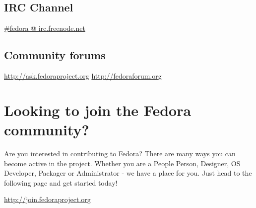 \documentclass[
letterpaper,
10pt
]{leaflet}
\begin{document}
\subsection{IRC Channel}
\href{http://webchat.freenode.net/?channels=#fedora}{\#fedora @ irc.freenode.net}

\subsection{Community forums}
\href{http://ask.fedoraproject.org}{http://ask.fedoraproject.org}
\href{http://fedoraforum.org}{http://fedoraforum.org}


\section{\textcolor{FedoraBlue}{Looking to join the Fedora community?}}
Are you interested in contributing to Fedora? There are many ways you can become active in the project.  Whether you are a People Person, Designer, OS Developer, Packager or Administrator - we have a place for you. Just head to the following page and get started today!

\begin{center}\href{http://join.fedoraproject.org}{http://join.fedoraproject.org}\end{center}
\end{document}
